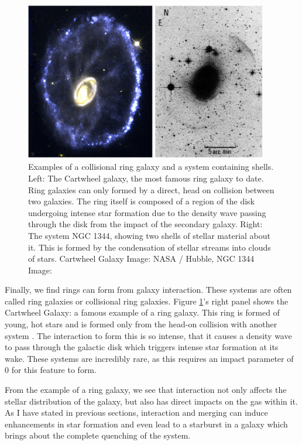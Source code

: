 \begin{figure}
    \centering
    \includegraphics[width=0.95\textwidth]{Introduction/figures/shells-rings.jpg}
    \caption{Examples of a collisional ring galaxy and a system containing shells. Left: The Cartwheel galaxy, the most famous ring galaxy to date. Ring galaxies can only formed by a direct, head on collision between two galaxies. The ring itself is composed of a region of the disk undergoing intense star formation due to the density wave passing through the disk from the impact of the secondary galaxy. Right: The system NGC 1344, showing two shells of stellar material about it. This is formed by the condensation of stellar streams into clouds of stars. Cartwheel Galaxy Image: NASA / Hubble, NGC 1344 Image: \citet{1983ApJ...274..534M}}
    \label{fig:tidal-features-ex}
\end{figure}

Finally, we find rings can form from galaxy interaction. These systems are often called ring galaxies or collisional ring galaxies. Figure \ref{fig:tidal-features-ex}'s right panel shows the Cartwheel Galaxy: a famous example of a ring galaxy. This ring is formed of young, hot stars and is formed only from the head-on collision with another system \citep{1976ApJ...209..382L}. The interaction to form this is so intense, that it causes a density wave to pass through the galactic disk which triggers intense star formation at its wake. These systems are incredibly rare, as this requires an impact parameter of 0 for this feature to form.

From the example of a ring galaxy, we see that interaction not only affects the stellar distribution of the galaxy, but also has direct impacts on the gas within it. As I have stated in previous sections, interaction and merging can induce enhancements in star formation and even lead to a starburst in a galaxy which brings about the complete quenching of the system.

